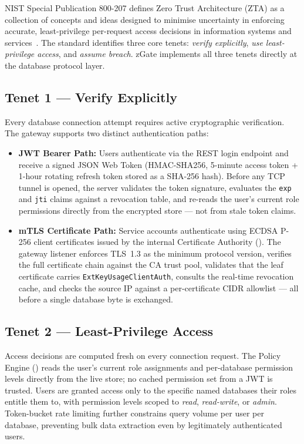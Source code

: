 NIST Special Publication 800-207 defines Zero Trust Architecture (ZTA) as a collection of concepts and ideas designed to minimise uncertainty in enforcing accurate, least-privilege per-request access decisions in information systems and services~\cite{nist-zt}. The standard identifies three core tenets: \textit{verify explicitly}, \textit{use least-privilege access}, and \textit{assume breach}. zGate implements all three tenets directly at the database protocol layer.

\subsection{Tenet 1 --- Verify Explicitly}

Every database connection attempt requires active cryptographic verification. The gateway supports two distinct authentication paths:

\begin{itemize}
    \item \textbf{JWT Bearer Path:} Users authenticate via the REST login endpoint and receive a signed JSON Web Token (HMAC-SHA256, 5-minute access token + 1-hour rotating refresh token stored as a SHA-256 hash). Before any TCP tunnel is opened, the server validates the token signature, evaluates the \texttt{exp} and \texttt{jti} claims against a revocation table, and re-reads the user's current role permissions directly from the encrypted store --- not from stale token claims.
    \item \textbf{mTLS Certificate Path:} Service accounts authenticate using ECDSA P-256 client certificates issued by the internal Certificate Authority (). The gateway listener enforces TLS~1.3 as the minimum protocol version, verifies the full certificate chain against the CA trust pool, validates that the leaf certificate carries \texttt{ExtKeyUsageClientAuth}, consults the real-time revocation cache, and checks the source IP against a per-certificate CIDR allowlist --- all before a single database byte is exchanged.
\end{itemize}

\subsection{Tenet 2 --- Least-Privilege Access}

Access decisions are computed fresh on every connection request. The Policy Engine () reads the user's current role assignments and per-database permission levels directly from the live store; no cached permission set from a JWT is trusted. Users are granted access only to the specific named databases their roles entitle them to, with permission levels scoped to \textit{read}, \textit{read-write}, or \textit{admin}. Token-bucket rate limiting further constrains query volume per user per database, preventing bulk data extraction even by legitimately authenticated users.

